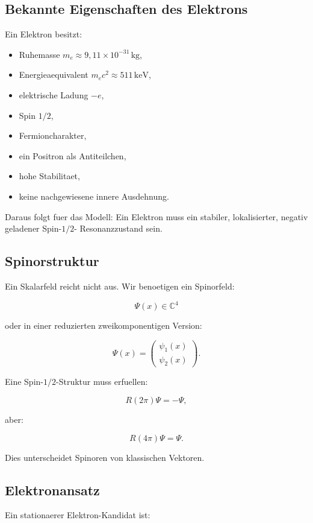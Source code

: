 \documentclass[11pt,a4paper]{article}
\begin{document}
\subsection{Bekannte Eigenschaften des Elektrons}

Ein Elektron besitzt:
\begin{itemize}
  \item Ruhemasse $m_e \approx 9{,}11\times 10^{-31}\,\mathrm{kg}$,
  \item Energieaequivalent $m_ec^2 \approx 511\,\mathrm{keV}$,
  \item elektrische Ladung $-e$,
  \item Spin $1/2$,
  \item Fermioncharakter,
  \item ein Positron als Antiteilchen,
  \item hohe Stabilitaet,
  \item keine nachgewiesene innere Ausdehnung.
\end{itemize}

Daraus folgt fuer das Modell: Ein Elektron muss ein stabiler, lokalisierter, negativ geladener Spin-$1/2$-
Resonanzzustand sein.

\subsection{Spinorstruktur}

Ein Skalarfeld reicht nicht aus. Wir benoetigen ein Spinorfeld:

\[
\Psi(x) \in \mathbb{C}^4
\]

oder in einer reduzierten zweikomponentigen Version:

\[
\Psi(x)=
\begin{pmatrix}
\psi_1(x)\\
\psi_2(x)
\end{pmatrix}.
\]

Eine Spin-$1/2$-Struktur muss erfuellen:

\[
R(2\pi)\Psi = -\Psi,
\]

aber:

\[
R(4\pi)\Psi = \Psi.
\]

Dies unterscheidet Spinoren von klassischen Vektoren.

\subsection{Elektronansatz}

Ein stationaerer Elektron-Kandidat ist:
\end{document}
